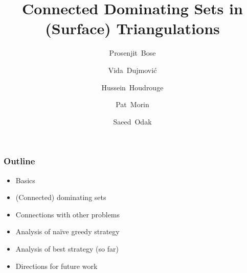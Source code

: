 \documentclass{beamer}
\title{Connected Dominating Sets in \newline (Surface) Triangulations}
\author{}
\author{%
  Prosenjit~Bose \and
  Vida~Dujmović \and
  Hussein~Houdrouge \and
  Pat~Morin \and
  Saeed~Odak}
\date{}
\begin{document}
\begin{frame}
    \maketitle
\end{frame}

\begin{frame}
  \frametitle{Outline}

  \begin{itemize}
    \item Basics
    \item (Connected) dominating sets
    \item Connections with other problems
    \item Analysis of naïve greedy strategy
    \item Analysis of best strategy (so far)
    \item Directions for future work
  \end{itemize}
\end{frame}
\end{document}
